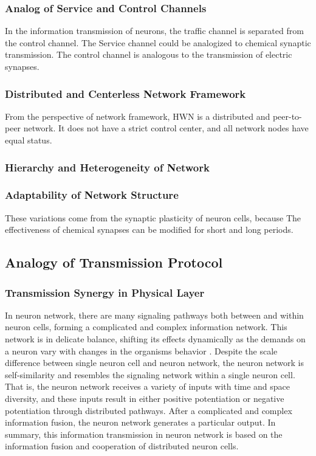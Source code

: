 \documentclass[journal,comsoc]{IEEEtran}
\begin{document}
			\subsubsection{Analog of Service and Control Channels}
				In the information transmission of neurons, the traffic channel is separated from the control channel.
				The Service channel could be analogized to chemical synaptic transmission. 			
				The control channel is analogous to the transmission of electric synapses. 
				
			\subsubsection{Distributed and Centerless Network Framework}
				From the perspective of network framework, HWN is a distributed and peer-to-peer network. 
				It does not have a strict control center, and all network nodes have equal status.

				
			\subsubsection{Hierarchy and Heterogeneity of Network}
					
			\subsubsection{Adaptability of Network Structure}
				These variations come from the synaptic plasticity of neuron cells, because The effectiveness of chemical synapses can be modified for short and long periods\cite{kandel2000principles}.
				
			
		\subsection{Analogy of Transmission Protocol}

			\subsubsection{Transmission Synergy in Physical Layer}
				In neuron network, there are many signaling pathways both between and within neuron cells, forming a complicated and complex information network. 
				This network is in delicate balance, shifting its effects dynamically as the demands on a neuron vary with changes in the organisms behavior \cite{bear2007neuroscience} .
				Despite the scale difference between single neuron cell and neuron network, the neuron network is self-similarity and resembles the signaling network within a single neuron cell. 
				That is, the neuron network receives a variety of inputs with time and space diversity, and these inputs result in either positive potentiation or negative potentiation through distributed pathways. 
				After a complicated and complex information fusion, the neuron network generates a particular output. 
				In summary, this information transmission in neuron network is based on the information fusion and cooperation of distributed neuron cells.
\end{document}
